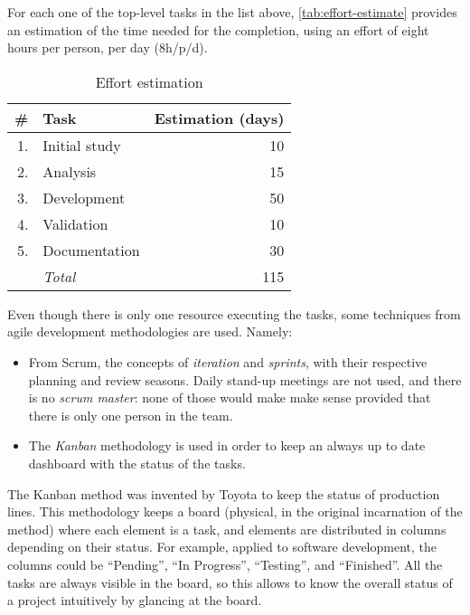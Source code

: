 For each one of the top-level tasks in the list above,
\autoref{tab:effort-estimate} provides an estimation of the time needed for
the completion, using an effort of eight hours per person, per day (8h/p/d).

\begin{table}
	\centering
	\begin{tabular}{rlr}
		\toprule
		\# & Task & Estimation (days) \\
		\midrule
		1. & Initial study     & 10 \\
		2. & Analysis          & 15 \\
		3. & Development       & 50 \\
		4. & Validation        & 10 \\
		5. & Documentation     & 30 \\
		\midrule
		   & \emph{Total}      & 115 \\
		\bottomrule
	\end{tabular}
	\caption{Effort estimation}
	\label{tab:effort-estimate}
\end{table}

Even though there is only one resource executing the tasks, some techniques
from agile development methodologies are used. Namely:

\begin{itemize}
	\item From Scrum, the concepts of \emph{iteration} and \emph{sprints}, with
    their respective planning and review seasons. Daily stand-up meetings are
    not used, and there is no \emph{scrum master}: none of those would make
    make sense provided that there is only one person in the team.
  \item The \emph{Kanban} methodology is used in order to keep an always
		up to date dashboard with the status of the tasks.
\end{itemize}

The Kanban method was invented by \gls{Toyota} to keep the status of
production lines. This methodology keeps a board (physical, in the original
incarnation of the method) where each element is a task, and elements are
distributed in columns depending on their status. For example, applied to
software development, the columns could be “Pending”, “In Progress”,
“Testing”, and “Finished”. All the tasks are always visible in the board, so
this allows to know the overall status of a project intuitively by glancing at
the board.
